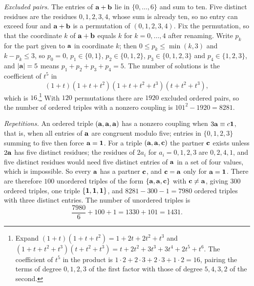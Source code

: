 \emph{Excluded pairs.} The entries of $\mathbf{a}+\mathbf{b}$ lie in $\{0,\dots,6\}$ and
sum to ten. Five distinct residues are the residues $0,1,2,3,4$, whose sum
is already ten, so no entry can exceed four and $\mathbf{a}+\mathbf{b}$ is a permutation
of $(0,1,2,3,4)$. Fix the permutation, so that the coordinate $k$ of
$\mathbf{a}+\mathbf{b}$ equals $k$ for $k=0,\dots,4$ after renaming. Write $p_k$ for the
part given to $\mathbf{a}$ in coordinate $k$; then $0\le p_k\le\min(k,3)$ and
$k-p_k\le3$, so $p_0=0$, $p_1\in\{0,1\}$, $p_2\in\{0,1,2\}$,
$p_3\in\{0,1,2,3\}$ and $p_4\in\{1,2,3\}$, and $|\mathbf{a}|=5$ means
$p_1+p_2+p_3+p_4=5$. The number of solutions is the coefficient of $t^5$ in
\[
(1+t)(1+t+t^2)(1+t+t^2+t^3)(t+t^2+t^3),
\]
which is $16$.\footnote{Expand $(1+t)(1+t+t^2)=1+2t+2t^2+t^3$ and
$(1+t+t^2+t^3)(t+t^2+t^3)=t+2t^2+3t^3+3t^4+2t^5+t^6$. The coefficient of
$t^5$ in the product is $1\cdot2+2\cdot3+2\cdot3+1\cdot2=16$, pairing the
terms of degree $0,1,2,3$ of the first factor with those of degree
$5,4,3,2$ of the second.} With $120$ permutations there are $1920$
excluded ordered pairs, so the number of ordered triples with a nonzero
coupling is $101^2-1920=8281$.

\emph{Repetitions.} An ordered triple $(\mathbf{a},\mathbf{a},\mathbf{a})$ has a nonzero coupling
when $3\mathbf{a}\equiv c\mathbf{1}$, that is, when all entries of $\mathbf{a}$ are congruent
modulo five; entries in $\{0,1,2,3\}$ summing to five then force
$\mathbf{a}=\mathbf{1}$. For a triple $(\mathbf{a},\mathbf{a},\mathbf{c})$ the partner $\mathbf{c}$ exists unless
$2\mathbf{a}$ has five distinct residues; the residues of $2a_i$ for
$a_i=0,1,2,3$ are $0,2,4,1$, and five distinct residues would need five
distinct entries of $\mathbf{a}$ in a set of four values, which is impossible. So
every $\mathbf{a}$ has a partner $\mathbf{c}$, and $\mathbf{c}=\mathbf{a}$ only for $\mathbf{a}=\mathbf{1}$. There
are therefore $100$ unordered triples of the form $\{\mathbf{a},\mathbf{a},\mathbf{c}\}$ with
$\mathbf{c}\ne\mathbf{a}$, giving $300$ ordered triples, one triple $\{\mathbf{1},\mathbf{1},\mathbf{1}\}$,
and $8281-300-1=7980$ ordered triples with three distinct entries. The
number of unordered triples is
\[
\frac{7980}{6}+100+1=1330+101=1431.
\]

